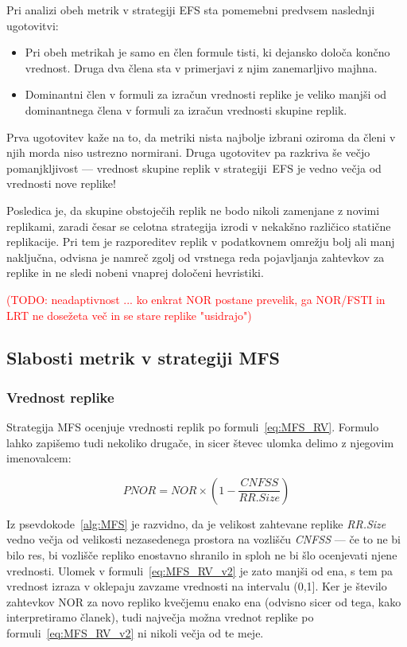 \documentclass[a4paper, 12pt]{book}
\newcommand{\TODO}[1]{\textcolor{red}{(TODO: #1)}}
\begin{document}
Pri analizi obeh metrik v strategiji EFS sta pomemebni predvsem naslednji
ugotovitvi:
\begin{itemize}
\item Pri obeh metrikah je samo en člen formule tisti, ki dejansko določa
končno vrednost. Druga dva člena sta v primerjavi z njim zanemarljivo majhna.

\item Dominantni člen v formuli za izračun vrednosti replike je veliko manjši
od dominantnega člena v formuli za izračun vrednosti skupine replik.
\end{itemize}

Prva ugotovitev kaže na to, da metriki nista najbolje izbrani oziroma da
členi v njih morda niso ustrezno normirani. Druga ugotovitev pa razkriva še
večjo pomanjkljivost --- vrednost skupine replik v strategiji~EFS je vedno
večja od vrednosti nove replike!

Posledica je, da skupine obstoječih replik ne bodo nikoli zamenjane z novimi
replikami, zaradi česar se celotna strategija izrodi v nekakšno različico
statične replikacije. Pri tem je razporeditev replik v podatkovnem
omrežju bolj ali manj naključna, odvisna je namreč zgolj od
vrstnega reda pojavljanja zahtevkov za replike in ne sledi nobeni vnaprej
določeni hevristiki.


\TODO{neadaptivnost ... ko enkrat NOR postane prevelik, ga NOR/FSTI in LRT
ne dosežeta več in se stare replike "usidrajo"}

\subsection{Slabosti metrik v strategiji MFS}

\subsubsection{Vrednost replike}

Strategija MFS ocenjuje vrednosti replik po formuli~\eqref{eq:MFS_RV}.
Formulo lahko zapišemo tudi nekoliko drugače, in sicer števec ulomka delimo z
njegovim imenovalcem:

\begin{equation}
  \mathit{PNOR} = \mathit{NOR} \times
                 \left(1 - \frac{\mathit{CNFSS}}{\mathit{ RR.Size}}\right)
  \label{eq:MFS_RV_v2}
\end{equation}

Iz psevdokode~\ref{alg:MFS} je razvidno, da je velikost zahtevane replike
\textit{RR.Size} vedno večja od velikosti nezasedenega prostora na vozlišču
\textit{CNFSS} --- če to ne bi bilo res, bi vozlišče repliko enostavno shranilo
in sploh ne bi šlo ocenjevati njene vrednosti. Ulomek v
formuli~\eqref{eq:MFS_RV_v2} je zato manjši od ena, s tem pa vrednost izraza v
oklepaju zavzame vrednosti na intervalu (0,1].
Ker je število zahtevkov NOR za novo repliko kvečjemu enako
ena (odvisno sicer od tega, kako interpretiramo članek), tudi največja možna
vrednot replike po formuli~\eqref{eq:MFS_RV_v2} ni nikoli večja od te meje.
\end{document}
